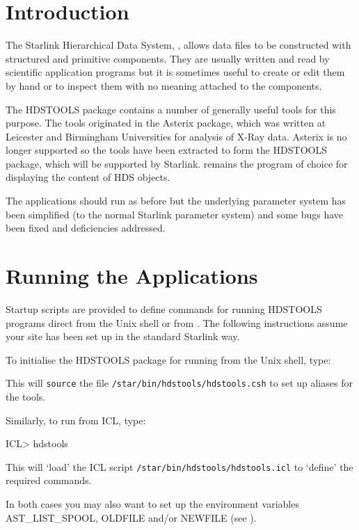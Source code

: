 \documentclass[twoside,11pt,nolof]{starlink}
\begin{document}
\scfrontmatter

\section{Introduction}
The Starlink Hierarchical Data System,
,
allows data files to be constructed with structured and primitive components.
They are usually written and read by scientific application programs but it is
sometimes useful to create or edit them by hand or to inspect them with no
meaning attached to the components.

The HDSTOOLS package contains a number of generally useful tools for this
purpose. The tools originated in the Asterix package, which was written at
Leicester and Birmingham Universities for analysis of X-Ray data.
Asterix is no longer supported so the tools have been extracted to form the
HDSTOOLS package, which will be supported by Starlink.
 remains the program of choice for displaying the
content of HDS objects.

The applications should run as before but the underlying parameter system has
been simplified (to the normal Starlink parameter system) and some bugs have
been fixed and deficiencies addressed.

\section{Running the Applications}
Startup scripts are provided to define commands for running HDSTOOLS programs
direct from the Unix shell or from
.
The following instructions assume your site has been set up in the standard
Starlink way.

To initialise the HDSTOOLS package for running from the Unix shell, type:
\begin{terminalv}
\end{terminalv}
This will \texttt{source} the file \texttt{/star/bin/hdstools/hdstools.csh}
to set up aliases for the tools.

Similarly, to run from ICL, type:
\begin{terminalv}
ICL> hdstools
\end{terminalv}
This will `load' the ICL script \texttt{/star/bin/hdstools/hdstools.icl}
to `define' the required commands.

In both cases you may also want to set up the environment variables
AST\_LIST\_SPOOL, OLDFILE and/or NEWFILE (see
).
\end{document}
